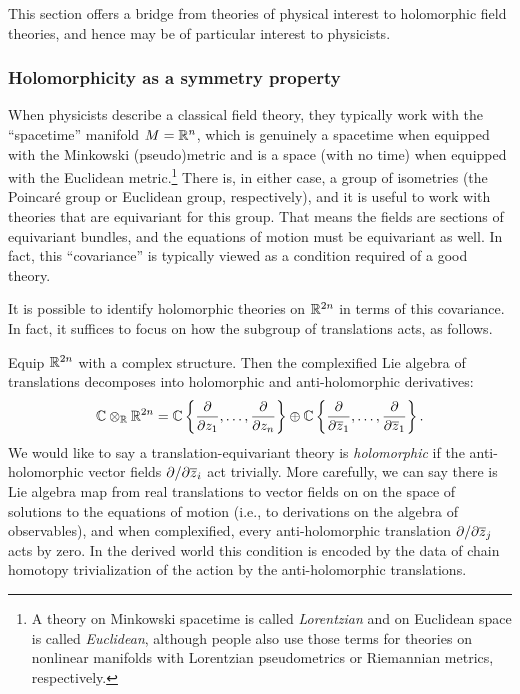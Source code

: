 \documentclass[11pt]{amsart}
\def\del{\partial}
\begin{document}

This section offers a bridge from theories of physical interest to holomorphic field theories,
and hence may be of particular interest to physicists.

\subsubsection{Holomorphicity as a symmetry property}

When physicists describe a classical field theory,
they typically work with the ``spacetime'' manifold $M = \mathbb R^n$,
which is genuinely a spacetime when equipped with the Minkowski (pseudo)metric and is a space (with no time) when equipped with the Euclidean metric.\footnote{A theory on Minkowski spacetime is called {\it Lorentzian} and on Euclidean space is called {\it Euclidean},
although people also use those terms for theories on nonlinear manifolds with Lorentzian pseudometrics or Riemannian metrics, respectively.}
There is, in either case, a group of isometries (the Poincar\'e group or Euclidean group, respectively),
and it is useful to work with theories that are equivariant for this group.
That means the fields are sections of equivariant bundles,
and the equations of motion must be equivariant as well.
In fact, this ``covariance'' is typically viewed as a condition required of a good theory.

It is possible to identify holomorphic theories on $\mathbb R^{2n}$ in terms of this covariance.
In fact, it suffices to focus on how the subgroup of translations acts, as follows.

Equip $\mathbb R^{2n}$ with a complex structure.
Then the complexified Lie algebra of translations decomposes into holomorphic and anti-holomorphic derivatives:
\[
\mathbb C \otimes_{\mathbb R} \mathbb R^{2n} 
= \mathbb C\left\{\frac{\partial}{\partial z_1}, \ldots, \frac{\partial}{\partial z_n}\right\} 
\oplus \mathbb C\left\{\frac{\partial}{\partial {\overline{z}}_1}, \ldots, \frac{\partial}{\partial {\overline{z}}_1}\right\}.
\]
We would like to say a translation-equivariant theory is {\em holomorphic} if the anti-holomorphic vector fields $\del / \del {\zbar_i}$ act trivially.
More carefully, we can say there is Lie algebra map from real translations to vector fields on on the space of solutions to the equations of motion (i.e., to derivations on the algebra of observables),
and when complexified, every anti-holomorphic translation $\partial/\partial {\overline{z}}_j$ acts by zero.
In the derived world this condition is encoded by the data of chain homotopy trivialization of the action by the anti-holomorphic translations. 
\end{document}
